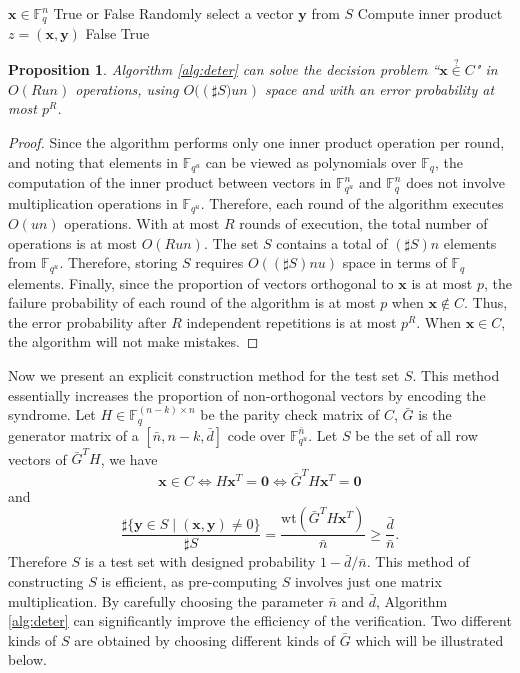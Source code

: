 \documentclass[a4paper, 10pt]{article}
\newtheorem{prop}[theorem]{Proposition}
\begin{document}
\begin{algorithm}[H]
\caption{DetermineCodeword}
\label{alg:deter}
\begin{algorithmic}[1]
\Require $\mathbf{x}\in \mathbb{F}_q^n$
\Ensure True or False 
    \State Randomly select a vector $\mathbf{y}$ from $S$
    \State Compute inner product $z = (\mathbf{x}, \mathbf{y})$
        \State \Return False
    \EndIf
\EndFor
\State \Return True
\end{algorithmic}
\end{algorithm}


\begin{prop}
    Algorithm \ref{alg:deter} can solve the decision problem “$\mathbf{x}\overset{?}{\in} C$" in $O(Run)$ operations, using $O(\left(\sharp S)un\right)$ space and with an error probability at most $p^R$.
\end{prop}
\begin{proof}
    Since the algorithm performs only one inner product operation per round, and noting that elements in $\mathbb{F}_{q^u}$ can be viewed as polynomials over $\mathbb{F}_q$, the computation of the inner product between vectors in $\mathbb{F}_{q^u}^n$ and $\mathbb{F}_q^n$ does not involve multiplication operations in $\mathbb{F}_{q^u}$. Therefore, each round of the algorithm executes $O(un)$ operations. With at most $R$ rounds of execution, the total number of operations is at most $O(Run)$. The set $S$ contains a total of $(\sharp S)n$ elements from $\mathbb{F}_{q^u}$. Therefore, storing $S$ requires $O((\sharp S) n  u)$ space in terms of $\mathbb{F}_q$ elements. Finally, since the proportion of vectors orthogonal to $\mathbf{x}$ is at most $p$, the failure probability of each round of the algorithm is at most $p$ when $\mathbf{x}\not \in C$. Thus, the error probability after $R$ independent repetitions is at most $p^R$. When $\mathbf{x}\in C$, the algorithm will not make mistakes.
\end{proof}
Now we present an explicit construction method for the test set $S$. This method essentially increases the proportion of non-orthogonal vectors by encoding the syndrome. Let $H\in \mathbb{F}_q^{(n-k)\times n}$ be the parity check matrix of $C$, $\bar{G}$ is the generator matrix of a $[\bar{n},n-k,\bar{d}]$ code over $\mathbb{F}_{q^u}^{\bar{n}}$. Let $S$ be the set of all row vectors of $\bar{G}^TH$, we have 
\[
\mathbf{x}\in C\Leftrightarrow H\mathbf{x}^T=\mathbf{0}\Leftrightarrow \bar{G}^TH\mathbf{x}^T=\mathbf{0}
\]
and
\begin{equation}
    \frac{\sharp\{\mathbf{y}\in S\;|\;(\mathbf{x},\mathbf{y})\neq 0\}}{\sharp S}=\frac{\mathrm{wt}(\bar{G}^TH\mathbf{x}^T)}{\bar{n}}\ge \frac{\bar{d}}{\bar{n}}.\label{2}
\end{equation}
Therefore $S$ is a test set with designed probability $1-\bar{d}/\bar{n}$. This method of constructing $S$ is efficient, as pre-computing $S$ involves just one matrix multiplication.  By carefully choosing the parameter $\bar{n}$  and $\bar{d}$, Algorithm \ref{alg:deter} can significantly improve the efficiency of the verification. Two different kinds of $S$ are obtained by choosing different kinds of $\bar{G}$ which will be illustrated below.
\end{document}
